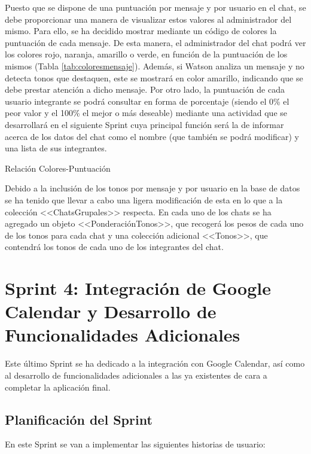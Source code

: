 Puesto que se dispone de una puntuación por mensaje y por usuario en el chat, se debe proporcionar una manera de visualizar estos valores al administrador del mismo. Para ello, se ha decidido mostrar mediante un código de colores la puntuación de cada mensaje. De esta manera, el administrador del chat podrá ver los colores rojo, naranja, amarillo o verde, en función de la puntuación de los mismos (Tabla \ref{tab:coloresmensaje}). Además, si Watson analiza un mensaje y no detecta tonos que destaquen, este se mostrará en color amarillo, indicando que se debe prestar atención a dicho mensaje. Por otro lado, la puntuación de cada usuario integrante se podrá consultar en forma de porcentaje (siendo el 0\% el peor valor y el 100\% el mejor o más deseable) mediante una actividad que se desarrollará en el siguiente Sprint cuya principal función será la de informar acerca de los datos del chat como el nombre (que también se podrá modificar) y una lista de sus integrantes.

\begin{table}[!htbp]
	\centering
	{\small
		
	}
	\caption[Relación de Colores-Puntuación]
	{Relación Colores-Puntuación}
	\label{tab:coloresmensaje}
\end{table}

Debido a la inclusión de los tonos por mensaje y por usuario en la base de datos se ha tenido que llevar a cabo una ligera modificación de esta en lo que a la colección \mbox{<<ChatsGrupales>>} respecta. En cada uno de los chats se ha agregado un objeto <<PonderaciónTonos>>, que recogerá los pesos de cada uno de los tonos para cada chat y una colección adicional <<Tonos>>, que contendrá los tonos de cada uno de los integrantes del chat.

\clearpage

\section{Sprint 4: Integración de Google Calendar y Desarrollo de Funcionalidades Adicionales}
Este último Sprint se ha dedicado a la integración con Google Calendar, así como al desarrollo de funcionalidades adicionales a las ya existentes de cara a completar la aplicación final.

\subsection{Planificación del Sprint}
En este Sprint se van a implementar las siguientes historias de usuario:

